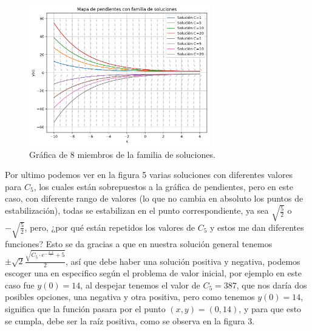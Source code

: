 \documentclass{article}
\begin{document}
\begin{figure}[H]
    \centering
    \includegraphics[width=0.7\textwidth]{Grafica_MSoluciones.png}
    \caption{Gráfica de 8 miembros de la familia de soluciones.}
    \label{fig:Familia_Soluciones}
\end{figure}

Por ultimo podemos ver en la figura 5 varias soluciones con diferentes valores para \(C_5\), los cuales están sobrepuestos a la gráfica de pendientes, pero en este caso, con diferente rango de valores (lo que no cambia en absoluto los puntos de estabilización), todas se estabilizan en el punto correspondiente, ya sea \(\sqrt{\frac{5}{2}}\) o \(-\sqrt{\frac{5}{2}}\), pero, ¿por qué están repetidos los valores de \(C_5\) y estos me dan diferentes funciones? 
Esto se da gracias a que en nuestra solución general tenemos \(\pm\sqrt{2}\frac{\sqrt{C_5\cdot e^{-\frac{4\cdot x}{7}}+5}}{2}\), así que debe haber una solución positiva y negativa, podemos escoger una en especifico según el problema de valor inicial, por ejemplo en este caso fue \(y(0)=14\), al despejar tenemos el valor de \(C_5=387\), que nos daría dos posibles opciones, una negativa y otra positiva, pero como tenemos \(y(0)=14\), significa que la función pasara por el punto \((x,y)=(0,14)\), y para que esto se cumpla, debe ser la raíz positiva, como se observa en la figura 3.

\printbibliography
\end{document}
